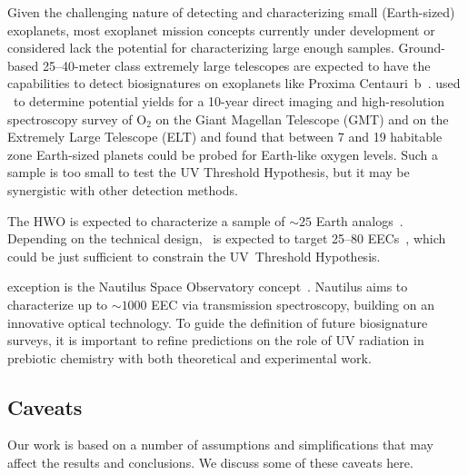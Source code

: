 \documentclass[twocolumn,twocolappendix,linenumbers]{aastex631}
\begin{document}
Given the challenging nature of detecting and characterizing small (Earth-sized) exoplanets, most exoplanet mission concepts currently under development or considered lack the potential for characterizing large enough samples.
Ground-based 25--40-meter class extremely large telescopes are expected to have the capabilities to detect biosignatures on exoplanets like Proxima Centauri~b~\citep[e.g.,][]{Wang2017,Hawker2019,Zhang2024,Vaughan2024}.
\citet{Hardegree-Ullman2024} used \bioverse\ to determine potential yields for a 10-year direct imaging and high-resolution spectroscopy survey of O$_2$ on the Giant Magellan Telescope (GMT) and on the Extremely Large Telescope (ELT) and found that between 7 and 19 habitable zone Earth-sized planets could be probed for Earth-like oxygen levels.
Such a sample is too small to test the UV Threshold Hypothesis, but it may be synergistic with other detection methods.

The \gls{HWO} is expected to characterize a sample of $\sim 25$ Earth analogs~\citep{Mamajek2023,Tuchow2024}.
Depending on the technical design, \life\ is expected to target 25–80 \glspl{EEC}~\citep{Kammerer2018,Quanz2022}, which could be just sufficient to constrain the UV~Threshold Hypothesis.

 exception is the Nautilus Space Observatory concept~\citep{Apai2019,Apai2022}.
Nautilus aims to characterize up to $\sim 1000$ \gls{EEC} via transmission spectroscopy, building on an innovative optical technology.
To guide the definition of future biosignature surveys, it is important to refine predictions on the role of \gls{UV} radiation in prebiotic chemistry with both theoretical and experimental work.



\subsection{Caveats}
Our work is based on a number of assumptions and simplifications that may affect the results and conclusions.
We discuss some of these caveats here.

\end{document}

